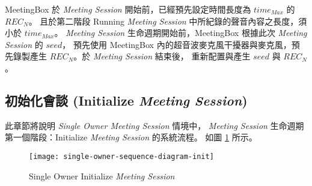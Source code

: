     MeetingBox 於 {\it Meeting Session} 開始前，已經預先設定時間長度為 $time_{Max}$ 的 $REC_{N}$。
且於第二階段 Running {\it Meeting Session} 中所紀錄的聲音內容之長度，須小於  $time_{Max}$。
{\it Meeting Session} 生命週期開始前，MeetingBox 根據此次 {\it Meeting Session} 的 $seed$，
預先使用 MeetingBox 內的超音波麥克風干擾器與麥克風，預先錄製產生 $REC_{N}$。於 {\it Meeting Session} 結束後，
重新配置與產生 $seed$ 與 $REC_{N}$。


\subsection{初始化會談 (Initialize {\it Meeting Session})}

    此章節將說明 {\it Single Owner Meeting Session} 情境中，
{\it Meeting Session} 生命週期第一個階段：Initialize {\it Meeting Session} 的系統流程。
如圖 \ref{fig.s-o-init} 所示。

\begin{figure}[H]
    \centering
    \texttt{[image: single-owner-sequence-diagram-init]}
    \caption{Single Owner Initialize {\it Meeting Session}}
    \label{fig.s-o-init}
\end{figure}

